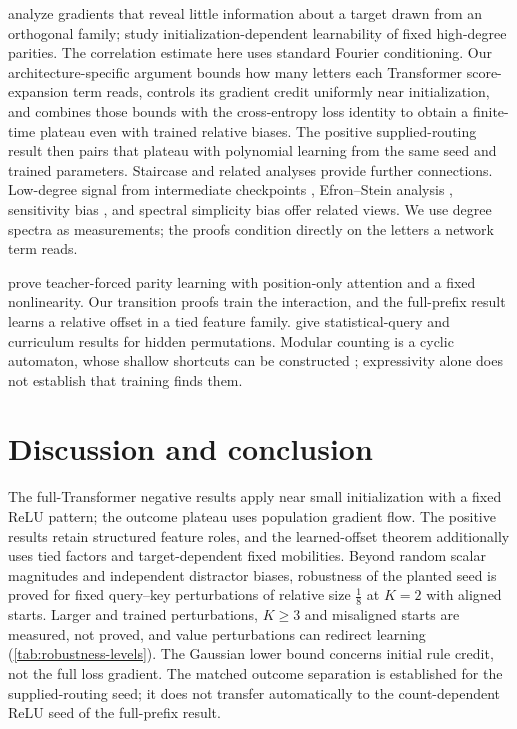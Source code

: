 \citet{shalevshwartz2017failures} analyze gradients that reveal little information
about a target drawn from an orthogonal family; \citet{abbe2025parities} study
initialization-dependent learnability of fixed high-degree parities.
The correlation estimate here uses standard Fourier conditioning. Our architecture-specific
argument bounds how many letters each Transformer score-expansion term reads, controls
its gradient credit uniformly near initialization, and combines those bounds with the
cross-entropy loss identity to obtain a finite-time plateau even with trained relative biases.
The positive supplied-routing result then pairs that plateau with polynomial learning
from the same seed and trained parameters. Staircase and related analyses
\citep{abbe2021staircase,abbe2022mergedstaircase,abbe2023sgd} provide further connections.
Low-degree signal from intermediate checkpoints \citep{panigrahi2025progressive}, Efron--Stein
analysis \citep{li2025noise}, sensitivity bias \citep{hahn2024sensitive}, and spectral simplicity
bias \citep{yang2019spectral} offer related views. We use degree spectra as measurements;
the proofs condition directly on the letters a network term reads.

\citet{kim2024parity} prove teacher-forced parity learning with position-only attention and a fixed
nonlinearity. Our transition proofs train the interaction, and the full-prefix result learns a
relative offset in a tied feature family. \citet{wang2025compositional} give statistical-query
and curriculum results for hidden permutations. Modular counting is a cyclic automaton,
whose shallow shortcuts can be constructed \citep{liu2023automata}; expressivity alone does
not establish that training finds them.

\section{Discussion and conclusion}
\label{sec:conclusion}
\label{sec:discussion}

The full-Transformer negative results apply near small initialization with a fixed ReLU pattern; the outcome
plateau uses population gradient flow. The positive results retain structured feature roles,
and the learned-offset theorem additionally uses tied factors and target-dependent fixed
mobilities. Beyond random scalar magnitudes and independent distractor biases, robustness of the planted seed is proved for
fixed query--key perturbations of relative size $\frac18$ at $K=2$ with aligned starts. Larger and trained perturbations,
$K\ge3$ and misaligned starts are measured, not proved, and value perturbations can redirect learning
(\cref{tab:robustness-levels}). The Gaussian lower bound concerns initial rule credit, not the full loss gradient.
The matched outcome separation is established for the supplied-routing seed; it does not
transfer automatically to the count-dependent ReLU seed of the full-prefix result.

